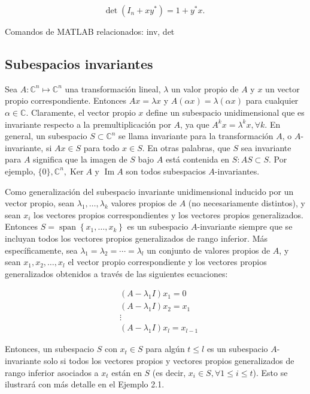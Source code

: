 \documentclass[11pt]{article}
\begin{document}
$$
\operatorname{det}\left(I_{n}+x y^{*}\right)=1+y^{*} x \text {. }
$$

Comandos de MATLAB relacionados: inv, det

\subsection*{Subespacios invariantes}
Sea $A: \mathbb{C}^{n} \longmapsto \mathbb{C}^{n}$ una transformación lineal, $\lambda$ un valor propio de $A$ y $x$ un vector propio correspondiente. Entonces $A x=\lambda x$ y $A(\alpha x)=\lambda(\alpha x)$ para cualquier $\alpha \in \mathbb{C}$. Claramente, el vector propio $x$ define un subespacio unidimensional que es invariante respecto a la premultiplicación por $A$, ya que $A^{k} x=\lambda^{k} x, \forall k$. En general, un subespacio $S \subset \mathbb{C}^{n}$ se llama invariante para la transformación $A$, o $A$-invariante, si $A x \in S$ para todo $x \in S$. En otras palabras, que $S$ sea invariante para $A$ significa que la imagen de $S$ bajo $A$ está contenida en $S: A S \subset S$. Por ejemplo, $\{0\}, \mathbb{C}^{n}, \operatorname{Ker} A$ y $\operatorname{Im} A$ son todos subespacios $A$-invariantes.

Como generalización del subespacio invariante unidimensional inducido por un vector propio, sean $\lambda_{1}, \ldots, \lambda_{k}$ valores propios de $A$ (no necesariamente distintos), y sean $x_{i}$ los vectores propios correspondientes y los vectores propios generalizados. Entonces $S=\operatorname{span}\left\{x_{1}, \ldots, x_{k}\right\}$ es un subespacio $A$-invariante siempre que se incluyan todos los vectores propios generalizados de rango inferior. Más específicamente, sea $\lambda_{1}=\lambda_{2}=\cdots=\lambda_{l}$ un conjunto de valores propios de $A$, y sean $x_{1}, x_{2}, \ldots, x_{l}$ el vector propio correspondiente y los vectores propios generalizados obtenidos a través de las siguientes ecuaciones:

$$
\begin{aligned}
& \left(A-\lambda_{1} I\right) x_{1}=0 \\
& \left(A-\lambda_{1} I\right) x_{2}=x_{1} \\
& \vdots \\
& \left(A-\lambda_{1} I\right) x_{l}=x_{l-1}
\end{aligned}
$$

Entonces, un subespacio $S$ con $x_{t} \in S$ para algún $t \leq l$ es un subespacio $A$-invariante solo si todos los vectores propios y vectores propios generalizados de rango inferior asociados a $x_{t}$ están en $S$ (es decir, $x_{i} \in S, \forall 1 \leq i \leq t$). Esto se ilustrará con más detalle en el Ejemplo 2.1.
\end{document}

